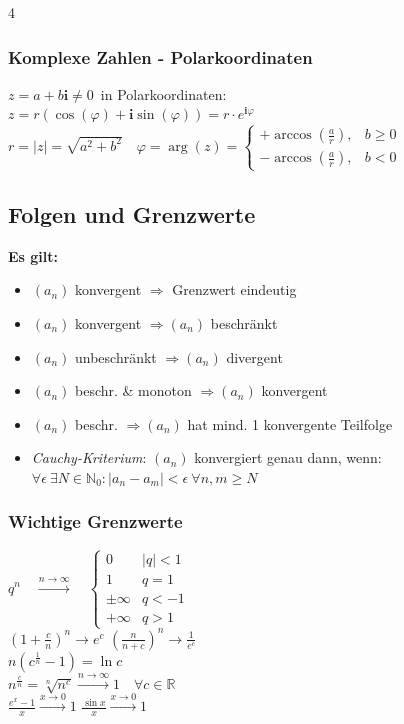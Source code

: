 \documentclass[6pt,a4paper]{scrartcl}
\begin{document}
\begin{multicols*}{4}
	\subsubsection{Komplexe Zahlen - Polarkoordinaten}
	$z=a+b\mathbf{i}\ne0$\ in Polarkoordinaten:\\
	$z=r (\cos(\varphi)+\mathbf{i}\sin(\varphi))=r\cdot e^{\mathbf{i} \varphi}$\\
	$r=|z|=\sqrt{a^2+b^2}\quad\varphi=\arg(z)=\begin{cases}+\arccos \left( \frac{a}{r}\right),  & b\ge0   \\  -\arccos \left( \frac{a}{r}\right), & b<0\end{cases}$

	\subsection{Folgen und Grenzwerte}
	\begin{sectionbox}
		\textbf{Es gilt:}
		\begin{itemize}
			\item $(a_n)$ konvergent $\Longrightarrow$ Grenzwert eindeutig
			\item $(a_n)$ konvergent $\Longrightarrow (a_n)$ beschränkt
			\item $(a_n)$ unbeschränkt $\Longrightarrow (a_n)$ divergent
			\item $(a_n)$ beschr. \& monoton $\Longrightarrow (a_n)$ konvergent
			\item $(a_n)$ beschr. $\Longrightarrow (a_n)$ hat mind. 1 konvergente Teilfolge
			\item \emph{Cauchy-Kriterium}: $(a_n)$ konvergiert genau dann, wenn:\\
			      $\forall \epsilon \ \exists N \in \mathbb N_0: |a_n-a_m| < \epsilon \ \forall n,m \ge N$
		\end{itemize}
	\end{sectionbox}

	\begin{sectionbox}
		\subsubsection{Wichtige Grenzwerte}
		$q^n \quad \overset{n \rightarrow \infty}{\longrightarrow} \quad \begin{cases} 0 & |q|<1 \\ 1 & q=1 \\ \pm \infty & q < -1  \\  + \infty & q > 1\end{cases}$ \\
		$\left(1+\frac{c}{n}\right)^n \rightarrow e^c$ \qquad $\left(\frac{n}{n+c}\right)^n \rightarrow \frac{1}{e^c} $ \\
		$n\left(c^{\frac1{n}}-1\right) = \ln c$ \\
		$n^{\frac{c}{n}}=\sqrt[n]{n^c} \overset{n \rightarrow \infty}{\longrightarrow} 1 \quad \forall c \in \mathbb R$ \\
		$\frac{e^x-1}{x} \overset{x \rightarrow 0}{\longrightarrow} 1$ \qquad	$\frac{\sin x}{x} \overset{x \rightarrow 0}{\longrightarrow} 1$
	\end{sectionbox}


\end{multicols*}
\end{document}
